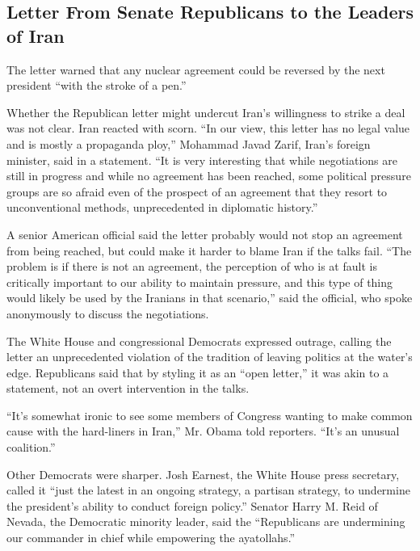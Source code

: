 \hypertarget{letter-from-senate-republicans-to-the-leaders-of-iran}{%
\subsection{Letter From Senate Republicans to the Leaders of
Iran}\label{letter-from-senate-republicans-to-the-leaders-of-iran}}

The letter warned that any nuclear agreement could be reversed by the
next president ``with the stroke of a pen.''

Whether the Republican letter might undercut Iran's willingness to
strike a deal was not clear. Iran reacted with scorn. ``In our view,
this letter has no legal value and is mostly a propaganda ploy,''
Mohammad Javad Zarif, Iran's foreign minister, said in a statement. ``It
is very interesting that while negotiations are still in progress and
while no agreement has been reached, some political pressure groups are
so afraid even of the prospect of an agreement that they resort to
unconventional methods, unprecedented in diplomatic history.''

A senior American official said the letter probably would not stop an
agreement from being reached, but could make it harder to blame Iran if
the talks fail. ``The problem is if there is not an agreement, the
perception of who is at fault is critically important to our ability to
maintain pressure, and this type of thing would likely be used by the
Iranians in that scenario,'' said the official, who spoke anonymously to
discuss the negotiations.

The White House and congressional Democrats expressed outrage, calling
the letter an unprecedented violation of the tradition of leaving
politics at the water's edge. Republicans said that by styling it as an
``open letter,'' it was akin to a statement, not an overt intervention
in the talks.

``It's somewhat ironic to see some members of Congress wanting to make
common cause with the hard-liners in Iran,'' Mr. Obama told reporters.
``It's an unusual coalition.''

Other Democrats were sharper. Josh Earnest, the White House press
secretary, called it ``just the latest in an ongoing strategy, a
partisan strategy, to undermine the president's ability to conduct
foreign policy.'' Senator Harry M. Reid of Nevada, the Democratic
minority leader, said the ``Republicans are undermining our commander in
chief while empowering the ayatollahs.''

